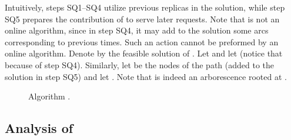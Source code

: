 \documentclass[11pt]{article}
\begin{document}
\noindent Intuitively, steps SQ1--SQ4 utilize previous replicas in the solution, while
step SQ5 prepares the contribution of  to serve later requests.
Note that  is not an online algorithm, since in step SQ4,
it may add to the solution some arcs corresponding to previous times.
Such an action cannot be preformed by an online algorithm.
Denote by  the feasible solution  of .
Let  and let 
(notice that  because of step SQ4).
Similarly, let 
be the nodes of the path 
(added to the solution in  step SQ5)
and let .
Note that  is indeed an arborescence rooted at .




\begin{figure}[ht!]
\fboxsep=0.2cm
\caption{\label{figure:Pseducode Squarem}
Algorithm .
}
\end{figure}



\newpage
\subsection{Analysis of }
\label{subsec: Analysis Square}
\end{document}
